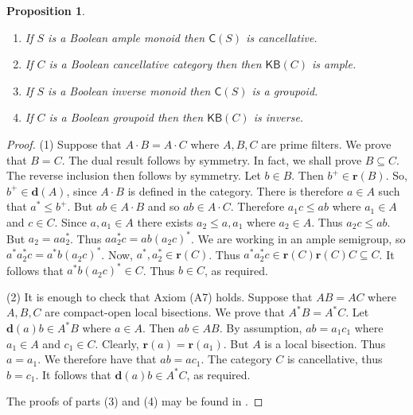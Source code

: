 \documentclass[a4paper]{amsart}
\newtheorem{proposition}[theorem]{Proposition}
\begin{document}
\begin{proposition}\label{prop:fury} \mbox{}
\begin{enumerate}

\item If $S$ is a Boolean ample monoid then $\mathsf{C}(S)$ is cancellative.

\item If $C$ is a Boolean cancellative category then
then $\mathsf{KB}(C)$ is ample.

\item If $S$ is a Boolean inverse monoid then $\mathsf{C}(S)$ is a groupoid.

\item If $C$ is a Boolean groupoid then
then $\mathsf{KB}(C)$ is inverse.



\end{enumerate}
\end{proposition}
\begin{proof} (1) Suppose that $A \cdot B = A \cdot C$ where $A,B,C$ are prime filters.
We prove that $B = C$. The dual result follows by symmetry.
In fact, we shall prove $B \subseteq C$.
The reverse inclusion then follows by symmetry.
Let $b \in B$.
Then $b^{+} \in \mathbf{r}(B)$.
So, $b^{+} \in \mathbf{d}(A)$, since $A \cdot B$ is defined in the category.
There is therefore $a \in A$ such that $a^{\ast} \leq b^{+}$.
But $ab \in A \cdot B$ and so $ab \in A \cdot C$.
Therefore $a_{1}c \leq ab$ where $a_{1} \in A$ and $c \in C$.
Since $a,a_{1} \in A$ there exists $a_{2} \leq a,a_{1}$ where $a_{2} \in A$.
Thus $a_{2}c \leq ab$.
But $a_{2} = aa_{2}^{\ast}$.
Thus $aa_{2}^{\ast}c = ab(a_{2}c)^{\ast}$.
We are working in an ample semigroup,
so $a^{\ast}a_{2}^{\ast}c = a^{\ast}b(a_{2}c)^{\ast}$.
Now, $a^{\ast}, a_{2}^{\ast} \in \mathbf{r}(C)$.
Thus $a^{\ast}a_{2}^{\ast}c \in \mathbf{r}(C)\mathbf{r}(C)C \subseteq C$.
It follows that  $a^{\ast}b(a_{2}c)^{\ast} \in C$.
Thus $b \in C$, as required.


(2) It is enough to check that Axiom (A7) holds.
Suppose that $AB = AC$ where $A,B,C$ are compact-open local bisections.
We prove that $A^{\ast}B = A^{\ast}C$.
Let $\mathbf{d}(a)b \in A^{\ast}B$ where $a \in A$.
Then $ab \in AB$.
By assumption, $ab = a_{1}c_{1}$ where $a_{1} \in A$ and $c_{1} \in C$.
Clearly, $\mathbf{r}(a) = \mathbf{r}(a_{1})$.
But $A$ is a local bisection.
Thus $a = a_{1}$.
We therefore have that $ab = ac_{1}$.
The category $C$ is cancellative, thus $b = c_{1}$.
It follows that $\mathbf{d}(a)b \in A^{\ast}C$, as required.

The proofs of parts (3) and (4) may be found in \cite[Chapter 9]{Lawson2025}. 
\end{proof}
\end{document}
